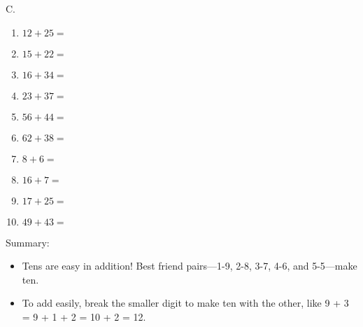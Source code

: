 \documentclass[a4paper,12pt]{article}
\begin{document}
\begin{multicols}{3}
C.
\begin{enumerate}[label=\arabic*.]
    \item \textbf{\Large $12 + 25 =$} \underline{\hspace{1cm}} \vspace{0.5cm} 
    \item \textbf{\Large $15 + 22 =$} \underline{\hspace{1cm}} \vspace{.5cm}
    \item \textbf{\Large $16 + 34 =$} \underline{\hspace{1cm}} \vspace{.5cm}
    \item \textbf{\Large $23 + 37 =$} \underline{\hspace{1cm}} \vspace{.5cm}
    \item \textbf{\Large $56 + 44 =$} \underline{\hspace{1cm}} \vspace{0.5cm}
    \item \textbf{\Large $62 + 38 =$} \underline{\hspace{1cm}} \vspace{0.5cm}
    \item \textbf{\Large $8 + 6 =$} \underline{\hspace{1cm}} \vspace{0.5cm} 
    \item \textbf{\Large $16 + 7 =$} \underline{\hspace{1cm}} \vspace{.5cm}
    \item \textbf{\Large $17 + 25 =$} \underline{\hspace{1cm}} \vspace{.5cm}
    \item \textbf{\Large $49 + 43 =$} \underline{\hspace{1cm}} \vspace{.5cm} 
\end{enumerate}

\end{multicols}
\vspace{1cm}
Summary:
\begin{itemize}
	\item Tens are easy in addition! Best friend pairs—1-9, 2-8, 3-7, 4-6, and 5-5—make ten.
	\item To add easily, break the smaller digit to make ten with the other, like 9 + 3 = 9 + 1 + 2 = 10 + 2 = 12.
\end{itemize}
\end{document}

